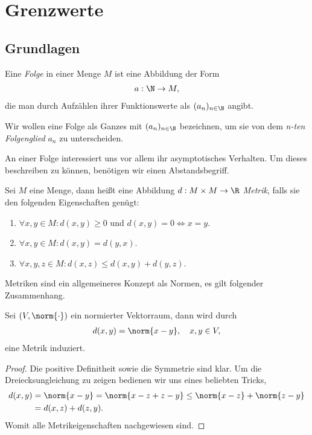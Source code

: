 \section{Grenzwerte}

\subsection{Grundlagen}

\begin{defn}
\label{def:1.1}
Eine \emph{Folge} in einer Menge $M$ ist eine Abbildung der Form
\begin{align*}
a : \N \to M,
\end{align*}
die man durch Aufzählen ihrer Funktionswerte als $(a_n)_{n\in\N}$
angibt.\fishhere
\end{defn}
\begin{bemn}
Wir wollen eine Folge als Ganzes mit $(a_n)_{n\in\N}$ bezeichnen, um
sie von dem \emph{n-ten Folgenglied} $a_n$ zu unterscheiden.\maphere
\end{bemn}

An einer Folge interessiert uns vor allem ihr asymptotisches Verhalten. Um
dieses beschreiben zu können, benötigen wir einen Abstandsbegriff.

\begin{defn}
\label{def:1.2}
Sei $M$ eine Menge, dann heißt eine Abbildung $d : M\times M\to\R$
\emph{Metrik}, falls sie den folgenden Eigenschaften genügt:
\begin{enumerate}
  \item $\forall x,y\in M: d(x,y)\ge 0$ und $d(x,y) = 0 \Leftrightarrow x =y$.
  \item $\forall x,y\in M: d(x,y) = d(y,x)$.
  \item $\forall x,y,z\in M: d(x,z) \le d(x,y) + d(y,z)$.\fishhere
\end{enumerate}
\end{defn}

Metriken sind ein allgemeineres Konzept als Normen, es gilt folgender
Zusammenhang.

\begin{propn}
Sei $(V,\norm{\cdot})$ ein normierter Vektorraum, dann wird durch
\begin{align*}
d(x,y) = \norm{x-y},\quad x,y\in V,
\end{align*}
eine Metrik induziert.\fishhere
\end{propn}
\begin{proof}
Die positive Definitheit sowie die Symmetrie sind klar. Um die
Dreiecksungleichung zu zeigen bedienen wir uns eines beliebten Tricks,
\begin{align*}
d(x,y) &= \norm{x-y} = \norm{x-z+z-y} \le \norm{x-z}+\norm{z-y} \\ 
&= d(x,z) + d(z,y).
\end{align*}
Womit alle Metrikeigenschaften nachgewiesen sind.\qedhere
\end{proof}

